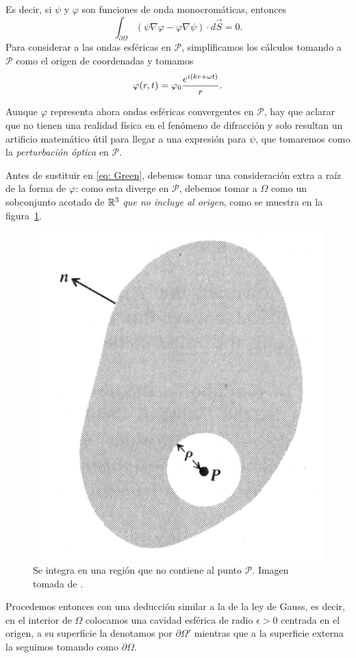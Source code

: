 \begin{multicols}{2}
Es decir, si $\psi$ y $\varphi$ son funciones de onda monocromáticas, entonces
\begin{equation}\label{eq: Green}
	\int_{\partial \Omega} (\psi \nabla \varphi - \varphi \nabla \psi) \cdot d\vec S = 0.
\end{equation}
Para considerar a las ondas esféricas en $\mathcal P$, simplificamos los cálculos tomando a $\mathcal P$ como el origen de coordenadas y tomamos
\begin{equation}
	\varphi(r, t) = \varphi_0 \frac{e^{i(kr + \omega t)}}{r}.
\end{equation}

Aunque $\varphi$ representa ahora ondas esféricas convergentes en $\mathcal P$, hay que aclarar que no tienen una realidad física en el fenómeno de difracción y solo resultan un artificio matemático útil para llegar a una expresión para $\psi$, que tomaremos como la \emph{perturbación óptica} en $\mathcal P$.

Antes de sustituir en \eqref{eq: Green}, debemos tomar una consideración extra a raíz de la forma de $\varphi$: como esta diverge en $\mathcal P$, debemos tomar a $\Omega$ como un sobconjunto acotado de $\mathbb R^3$ \emph{que no incluye al origen}, como se muestra en la figura~\ref{fig: integration}.

\begin{figure}[H]
	\centering
	\includegraphics[width=.6\linewidth]{Imagenes/kirchoff}
	\caption{Se integra en una región que no contiene al punto $\mathcal P$. Imagen tomada de \parencite{fowles-1989}.}
	\label{fig: integration}
\end{figure}

 Procedemos entonces con una deducción similar a la de la ley de Gauss, es decir, en el interior de $\Omega$ colocamos una cavidad esférica de radio $\epsilon > 0$ centrada en el origen, a su superficie la denotamos por $\partial \Omega'$ mientras que a la superficie externa la seguimos tomando como $\partial \Omega$.


\end{multicols}
